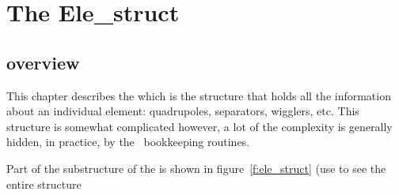 \chapter{The Ele\_struct}
\section{overview}

This chapter describes the  which is the structure that
holds all the information about an individual element: quadrupoles,
separators, wigglers, etc. This structure is somewhat complicated however,
a lot of the complexity is generally hidden, in practice, by the \bmad\ 
bookkeeping routines.

Part of the substructure of the  is shown
in figure~\ref{f:ele_struct} (use  to see the entire structure 
